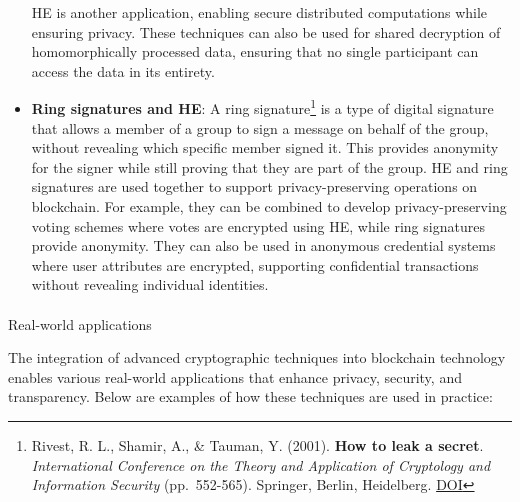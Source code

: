 \documentclass[
  letterpaper,
  DIV=11,
  numbers=noendperiod,
  oneside]{scrartcl}
\makeatletter
\let\oldparagraph\paragraph
\renewcommand{\paragraph}{
    \@ifstar
      \xxxParagraphStar
      \xxxParagraphNoStar
  }
\newcommand{\xxxParagraphStar}[1]{\oldparagraph*{#1}\mbox{}}
\newcommand{\xxxParagraphNoStar}[1]{\oldparagraph{#1}\mbox{}}
\makeatother
\begin{document}
\begin{itemize}
  HE is another application, enabling secure distributed computations
  while ensuring privacy. These techniques can also be used for shared
  decryption of homomorphically processed data, ensuring that no single
  participant can access the data in its entirety.
\item
  \textbf{Ring signatures and HE}: A ring signature\footnote{Rivest, R.
    L., Shamir, A., \& Tauman, Y. (2001). \textbf{How to leak a secret}.
    \emph{International Conference on the Theory and Application of
    Cryptology and Information Security} (pp.~552-565). Springer,
    Berlin, Heidelberg.
    \href{https://doi.org/10.1007/3-540-45682-1_32}{DOI}} is a type of
  digital signature that allows a member of a group to sign a message on
  behalf of the group, without revealing which specific member signed
  it. This provides anonymity for the signer while still proving that
  they are part of the group. HE and ring signatures are used together
  to support privacy-preserving operations on blockchain. For example,
  they can be combined to develop privacy-preserving voting schemes
  where votes are encrypted using HE, while ring signatures provide
  anonymity. They can also be used in anonymous credential systems where
  user attributes are encrypted, supporting confidential transactions
  without revealing individual identities.
\end{itemize}

\paragraph{Real-world applications}\label{real-world-applications}

The integration of advanced cryptographic techniques into blockchain
technology enables various real-world applications that enhance privacy,
security, and transparency. Below are examples of how these techniques
are used in practice:
\end{document}
